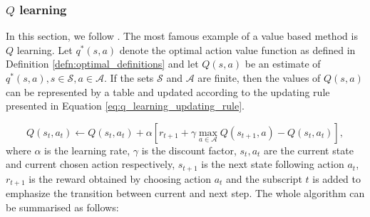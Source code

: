 \subsubsection{$Q$ learning}
In this section, we follow \cite[Section 6.5.]{sutton2018reinforcement}.
The most famous example of a value based method is $Q$ learning.
Let $q^*(s,a)$ denote the optimal action value function as defined in Definition \ref{defn:optimal_definitions} and let $Q(s,a)$ be an estimate of $q^*(s,a), s \in \mathcal{S}, a \in \mathcal{A}$. If the sets $\mathcal{S}$ and $\mathcal{A}$ are finite, then the values of $Q(s,a)$ can be represented by a table and updated according to the updating rule presented in Equation \ref{eq:q_learning_updating_rule}.

\begin{equation}
Q(s_t, a_t) \leftarrow Q(s_t, a_t) + \alpha \left[r_{t+1} + \gamma \underset{a \in \mathcal{A}}{\max}Q(s_{t+1}, a) - Q(s_t, a_t) \right],
\label{eq:q_learning_updating_rule}
\end{equation}
where $\alpha$ is the learning rate, $\gamma$ is the discount factor, $s_t, a_t$ are the current state and current chosen action respectively, $s_{t+1}$ is the next state following action $a_t$, $r_{t+1}$ is the reward obtained by choosing action $a_t$ and the subscript $t$ is added to emphasize the transition between current and next step.
The whole algorithm can be summarised as follows:

\renewcommand{\algorithmicrequire}{\textbf{Input:}}
\renewcommand{\algorithmicensure}{\textbf{Output:}}



